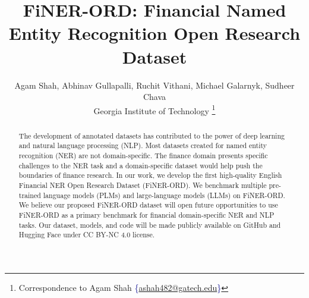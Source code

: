 \documentclass[11pt]{article}
\title{FiNER-ORD: Financial Named Entity Recognition Open Research Dataset}
\author{\hypersetup{linkcolor=black} Agam Shah\;, Abhinav Gullapalli\;, Ruchit Vithani\;, Michael Galarnyk\;, Sudheer Chava\\
Georgia Institute of Technology
\thanks{Correspondence to Agam Shah \textcolor{darkblue}{{\{\href{mailto:ashah482@gatech.edu}{ashah482@gatech.edu}\}}}}}
\begin{document}
\maketitle
\begin{abstract}

The development of annotated datasets has contributed to the power of deep learning and natural language processing (NLP). Most datasets created for named entity recognition (NER) are not domain-specific. The finance domain presents specific challenges to the NER task and a domain-specific dataset would help push the boundaries of finance research. In our work, we develop the first high-quality English Financial NER Open Research Dataset (FiNER-ORD). We benchmark multiple pre-trained language models (PLMs) and large-language models (LLMs) on FiNER-ORD. We believe our proposed FiNER-ORD dataset will open future opportunities to use FiNER-ORD as a primary benchmark for financial domain-specific NER and NLP tasks. Our dataset, models, and code will be made publicly available on GitHub and Hugging Face under CC BY-NC 4.0 license. 
\end{abstract}
\end{document}
